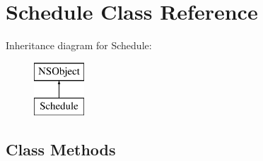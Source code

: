 \hypertarget{interface_schedule}{\section{Schedule Class Reference}
\label{interface_schedule}
}
Inheritance diagram for Schedule\+:\begin{figure}[H]
\begin{center}
\leavevmode
\includegraphics[height=2.000000cm]{interface_schedule}
\end{center}
\end{figure}
\subsection*{Class Methods}
